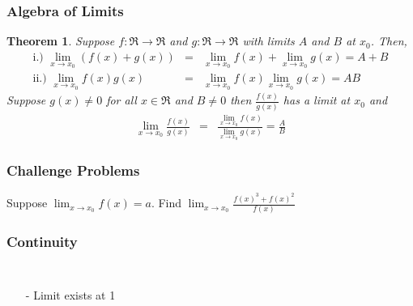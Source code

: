 \documentclass{beamer}
\newtheorem{thm}{Theorem}
\numberwithin{equation}{section}
\begin{document}
\begin{frame}
\frametitle{Algebra of Limits}

\begin{thm}
Suppose $f:\Re \rightarrow \Re$ and $g: \Re \rightarrow \Re$ with limits $A$ and $B$ at $x_{0}$.  Then, 
\begin{eqnarray}
\text{i.) } \lim_{x \rightarrow x_{0} } (f(x) + g(x) ) & = & \lim_{x \rightarrow x_{0}} f(x) + \lim_{x \rightarrow x_{0}} g(x)  = A + B\nonumber \\
\text{ii.) }\lim_{x \rightarrow x_{0} } f(x) g(x) & = & \lim_{x \rightarrow x_{0}} f(x) \lim_{x\rightarrow x_{0}} g(x)  = A B\nonumber 
\end{eqnarray}
Suppose $g(x) \neq 0$ for all $x \in \Re$ and $B \neq 0$ then $\frac{f(x)}{g(x)}$ has a limit at $x_{0}$ and 
\begin{eqnarray}
\lim_{x \rightarrow x_{0}} \frac{f(x)}{g(x)} & = &  \frac{\lim_{x\rightarrow x_{0} } f(x) }{\lim_{x \rightarrow x_{0} } g(x) } = \frac{A}{B}\nonumber 
\end{eqnarray}
\end{thm}


\end{frame}




\begin{frame}
\frametitle{Challenge Problems}


Suppose $\lim_{x \rightarrow x_{0} } f(x) = a$.  Find $\lim_{x\rightarrow x_{0}} \frac{f(x)^{3}  + f(x)^2}{f(x)}$



\end{frame}



\begin{frame}
\frametitle{Continuity}



\begin{columns}[]




\begin{itemize}
\item[-] Limit exists at 1 \pause 
{} \pause 
{}
\end{itemize}


\end{columns}


\end{frame}
\end{document}
